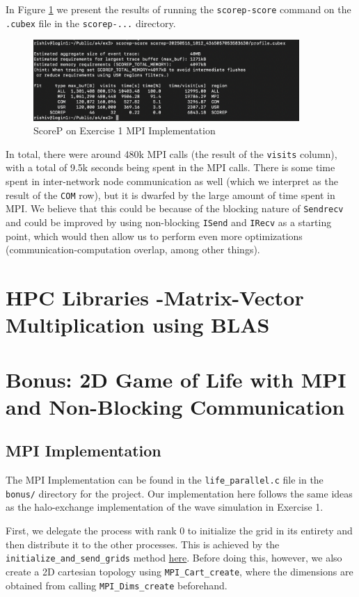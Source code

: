 \documentclass[a4paper,10pt]{article}
\begin{document}
In Figure \ref{fig:ex3_ex1_scorep} we present the results of running the \verb|scorep-score| command on the \verb|.cubex| file in the \verb|scorep-...| directory. 

\begin{figure}[H]
  \centering
  \includegraphics[width=0.9\textwidth]{img/ex3/ex1_scorep.png}
  \caption{ScoreP on Exercise 1 MPI Implementation}
  \label{fig:ex3_ex1_scorep}
\end{figure}

In total, there were around 480k MPI calls (the result of the \verb|visits| column), with a total of 9.5k seconds being spent in the MPI calls. There is some time spent in inter-network node communication as well (which we interpret as the result of the \verb|COM| row), but it is dwarfed by the large amount of time spent in MPI. We believe that this could be because of the blocking nature of \verb|Sendrecv| and could be improved by using non-blocking \verb|ISend| and \verb|IRecv| as a starting point, which would then allow us to perform even more optimizations (communication-computation overlap, among other things).

\section{HPC Libraries -Matrix-Vector Multiplication using BLAS}

\section{Bonus: 2D Game of Life with MPI and Non-Blocking Communication}
\subsection{MPI Implementation}
The MPI Implementation can be found in the \verb|life_parallel.c| file in the \verb|bonus/| directory for the project. Our implementation here follows the same ideas as the halo-exchange implementation of the wave simulation in Exercise 1. 

First, we delegate the process with rank 0 to initialize the grid in its entirety and then distribute it to the other processes. This is achieved by the \verb|initialize_and_send_grids| method \href{https://github.com/paulmyr/DD2356-MethodsHPC/blob/master/4_mpi/bonus/life_parallel.c#L34}{here}. Before doing this, however, we also create a 2D cartesian topology using \verb|MPI_Cart_create|, where the dimensions are obtained from calling \verb|MPI_Dims_create| beforehand. 
\end{document}
